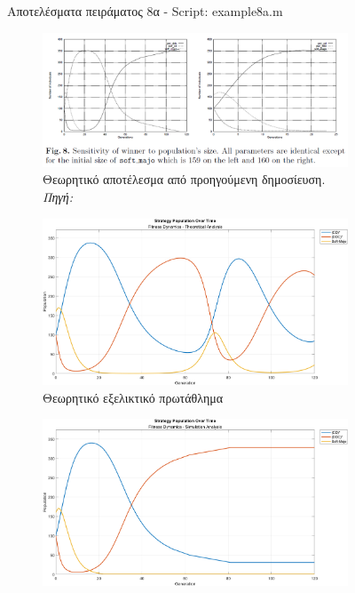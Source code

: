 \documentclass[12pt]{report}
\begin{document}
\begin{figure}[htbp]
\begin{subfigure}[b]{0.5\linewidth}
    \end{subfigure}

    \caption{Αποτελέσματα πειράματος 8α - \foreignlanguage{english}{Script: example8a.m}}
    \label{fig:fig_fit_8a}
\end{figure}

\begin{figure}[htbp]
    \centering

    \begin{subfigure}[b]{0.5\linewidth}
        \centering
        \includegraphics[width=\linewidth]{Figures Fitness Dynamics/8.png}
        \caption{Θεωρητικό αποτέλεσμα από προηγούμενη δημοσίευση. \textit{Πηγή:} \protect\cite{mathieu1999}}
    \end{subfigure}
    \hfill
    \begin{subfigure}[b]{0.5\linewidth}
        \centering
        \includegraphics[width=\linewidth]{Figures Fitness Dynamics/example8b.png}
        \caption{Θεωρητικό εξελικτικό πρωτάθλημα}
        \label{fig:fig_fit_8b_b}
    \end{subfigure}
    \hfill
    \begin{subfigure}[b]{0.5\linewidth}
        \centering
        \includegraphics[width=\linewidth]{Figures Fitness Dynamics/example8b-sim.png}

\end{subfigure}
\end{figure}
\end{document}
